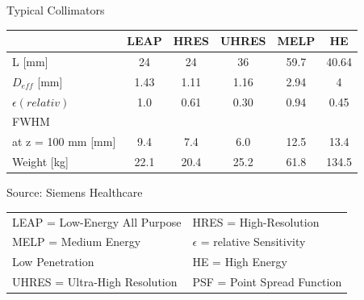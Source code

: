 \begin{frame}{Typical Collimators}
    \begin{center}
        \begin{table}[ht]
            \begin{tabular}{|l | c | c | c | c | c |}
                \hline
                                     & LEAP & HRES & UHRES & MELP & HE    \\
                \hline
                L [mm]               & 24   & 24   & 36    & 59.7 & 40.64 \\
                $D_{eff}$ [mm]       & 1.43 & 1.11 & 1.16  & 2.94 & 4     \\
                $\epsilon (relativ)$ & 1.0  & 0.61 & 0.30  & 0.94 & 0.45  \\
                \hline
                FWHM                 &      &      &       &      &       \\
                at z = 100 mm [mm]   & 9.4  & 7.4  & 6.0   & 12.5 & 13.4  \\
                Weight [kg]          & 22.1 & 20.4 & 25.2  & 61.8 & 134.5 \\
                \hline
            \end{tabular}
        \end{table}
        {\scriptsize Source: Siemens Healthcare}
        \begin{table}[ht]
            \begin{tabular}{l l }

                LEAP = Low-Energy All Purpose & HRES = High-Resolution            \\
                MELP = Medium Energy          & $\epsilon$ = relative Sensitivity \\
                Low Penetration               & HE = High Energy                  \\
                UHRES = Ultra-High Resolution & PSF = Point Spread Function       \\
            \end{tabular}
        \end{table}

    \end{center}
\end{frame}




